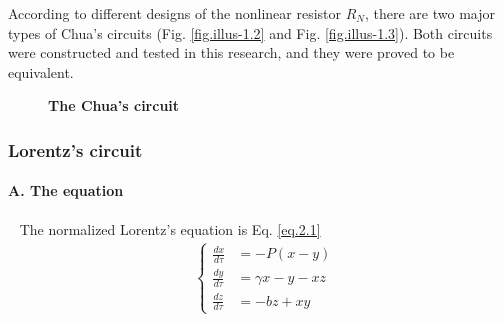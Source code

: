 \documentclass[10pt,a4paper,twocolumn,twoside,UTF8]{article}
\begin{document}
		According to different designs of the nonlinear resistor $R_N$, there are two major types of Chua's circuits (Fig. \ref{fig.illus-1.2} and Fig. \ref{fig.illus-1.3}). 
		Both circuits were constructed and tested in this research, and they were proved to be equivalent.

		\begin{figure}[htbp]
			\centering
			
			\caption{\textbf{The Chua's circuit}}
		\end{figure}
	
		\subsubsection{Lorentz's circuit\autocite{lorenzDeterministicNonperiodicFlow1963}}
		\paragraph{A. The equation}~
		\newline 
		\indent
		The normalized Lorentz's equation is Eq. \ref{eq.2.1}
		\begin{align}
			&\left\{
				\begin{aligned}
					\frac{dx}{d \tau} &= -P(x-y) \\
					\frac{dy}{d \tau} &= \gamma x - y - xz \\
					\frac{dz}{d \tau} &= -bz +xy
				\end{aligned}
			\right. 
			\label{eq.2.1}
		\end{align}
		
\end{document}
